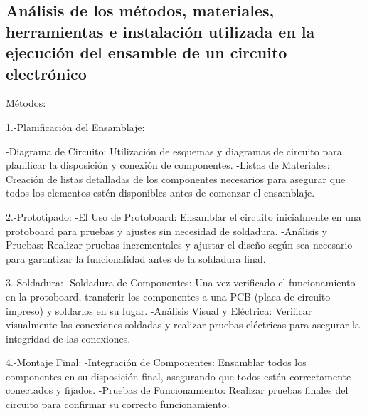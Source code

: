     \subsection{Análisis de los métodos, materiales, herramientas e instalación utilizada en la ejecución del ensamble de un circuito electrónico}
    Métodos:
    
    1.-Planificación del Ensamblaje:
    
    -Diagrama de Circuito: Utilización de esquemas y diagramas de circuito para planificar la disposición y conexión de componentes.
    -Listas de Materiales: Creación de listas detalladas de los componentes necesarios para asegurar que todos los elementos estén disponibles antes de comenzar el ensamblaje.
    
    2.-Prototipado:
    -El Uso de Protoboard: Ensamblar el circuito inicialmente en una protoboard para pruebas y ajustes sin necesidad de soldadura.
    -Análisis y Pruebas: Realizar pruebas incrementales y ajustar el diseño según sea necesario para garantizar la funcionalidad antes de la soldadura final.
    
    3.-Soldadura:
    -Soldadura de Componentes: Una vez verificado el funcionamiento en la protoboard, transferir los componentes a una PCB (placa de circuito impreso) y soldarlos en su lugar.
    -Análisis Visual y Eléctrica: Verificar visualmente las conexiones soldadas y realizar pruebas eléctricas para asegurar la integridad de las conexiones.
    
    4.-Montaje Final:
    -Integración de Componentes: Ensamblar todos los componentes en su disposición final, asegurando que todos estén correctamente conectados y fijados.
    -Pruebas de Funcionamiento: Realizar pruebas finales del circuito  para confirmar su correcto funcionamiento.
    
